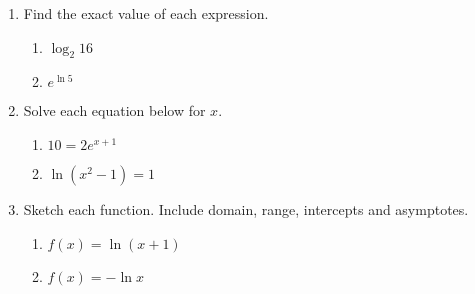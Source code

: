 \documentclass[11pt,fleqn]{article}
\begin{document}
\begin{enumerate}
	
\vfill
\item Find the exact value of each expression.
\begin{multicols}{2}
\begin{enumerate}
	\item $\log_2 16$
	\item $e^{\ln 5}$
	\end{enumerate}
	\end{multicols}
	\vspace{1in}

\newpage
\item Solve each equation below for $x$.
\begin{multicols}{2}
\begin{enumerate}
	\item $10=2e^{x+1}$
	\item $\ln (x^2-1)=1$
	\end{enumerate}
	\end{multicols}
	\vfill
\item Sketch each function. Include domain, range, intercepts and asymptotes.\\
\begin{multicols}{2}
\begin{enumerate}
	\item $f(x)=\ln(x+1)$
	
	
	\item $f(x)=- \ln x$
	
	
	\end{enumerate}
	\end{multicols}
	\vfill

\end{enumerate}
\end{document}
